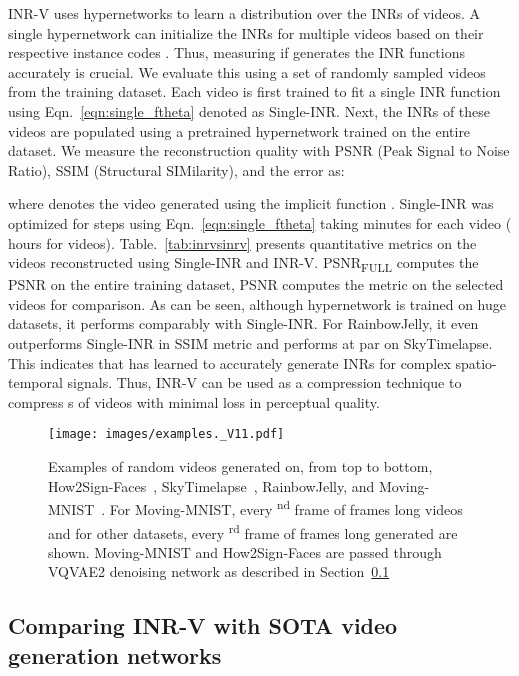 \documentclass[10pt]{article} \usepackage[accepted]{tmlr}
\begin{document}
INR-V uses hypernetworks to learn a distribution over the INRs of videos. A single hypernetwork  can initialize the INRs for multiple videos  based on their respective instance codes . Thus, measuring if  generates the INR functions  accurately is crucial.
We evaluate this using a set of  randomly sampled videos from the training dataset.  
Each video is first trained to fit a single INR function  using Eqn.~\ref{eqn:single_ftheta} denoted as Single-INR. Next, the INRs of these  videos are populated using a pretrained hypernetwork  trained on the entire dataset. We measure the reconstruction quality with PSNR (Peak Signal to Noise Ratio), SSIM (Structural SIMilarity), and the error as:

where  denotes the video generated using the implicit function . Single-INR was optimized for  steps using Eqn.~\ref{eqn:single_ftheta} taking  minutes for each video ( hours for  videos).
Table.~\ref{tab:inrvsinrv} presents quantitative metrics on the videos reconstructed using Single-INR and INR-V. PSNR\textsubscript{FULL} computes the PSNR on the entire training dataset, PSNR computes the metric on the selected  videos for comparison. 
As can be seen, 
although hypernetwork  is trained on huge datasets, it performs comparably with Single-INR. For RainbowJelly, it even outperforms Single-INR in SSIM metric and performs at par on SkyTimelapse. 
This indicates that  has learned to accurately generate INRs for complex spatio-temporal signals. Thus, INR-V can be used as a compression technique to compress s of videos with minimal loss in perceptual quality. 

\begin{figure}[t]
  \centering
  \texttt{[image: images/examples.\_V11.pdf]}
  \caption{\small Examples of random videos generated on, from top to bottom, How2Sign-Faces~\cite{how2sign}, SkyTimelapse~\cite{skytimelapse}, RainbowJelly, and Moving-MNIST~\cite{moving-mnist}. For Moving-MNIST, every \textsuperscript{nd} frame of  frames long videos and for other datasets, every \textsuperscript{rd} frame of  frames long generated are shown. Moving-MNIST and How2Sign-Faces are passed through VQVAE2 denoising network as described in Section~\ref{sec:video-gen-compare}}
  \label{fig:main_results}
\end{figure}
 
\subsection{Comparing INR-V with SOTA video generation networks}
\label{sec:video-gen-compare}
\end{document}
